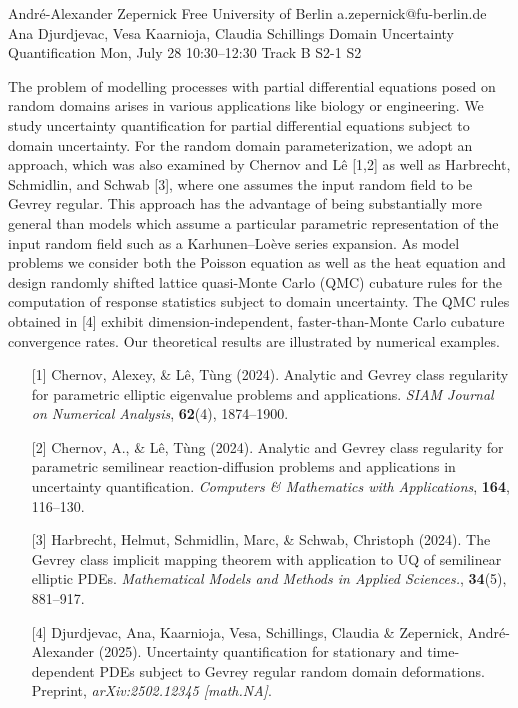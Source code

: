 \begin{talk}
  {André-Alexander Zepernick}%
  {Free University of Berlin}%
  {a.zepernick@fu-berlin.de}%
  {Ana Djurdjevac, Vesa Kaarnioja, Claudia Schillings}%
  {Domain Uncertainty Quantification}%
  {}%
  {Mon, July 28 10:30–12:30 Track B}%
  {S2-1}%
  {S2}%

The problem of modelling processes with partial differential equations posed on random domains arises in various applications like biology or engineering. We study uncertainty quantification for partial differential equations subject to domain uncertainty. For the random domain parameterization, we adopt an approach, which was also examined by Chernov and L\^{e} [1,2] as well as Harbrecht, Schmidlin, and Schwab [3], where one assumes the input random field to be Gevrey regular. This approach has the advantage of being substantially more general than models which assume a particular parametric representation of the input random field such as a Karhunen--Lo\`eve series expansion. As model problems we consider both the Poisson equation as well as the heat equation and design randomly shifted lattice quasi-Monte Carlo (QMC) cubature rules for the computation of response statistics subject to domain uncertainty. The QMC rules obtained in [4] exhibit dimension-independent, faster-than-Monte Carlo cubature convergence rates. Our theoretical results are illustrated by numerical examples.
\begin{enumerate}
    \item[{[1]}] Chernov, Alexey, \& L\^{e}, Tùng (2024). Analytic and Gevrey class regularity for parametric elliptic eigenvalue problems and applications. \emph{SIAM Journal on Numerical Analysis}, \textbf{62}(4), 1874--1900.
    \item[{[2]}] Chernov, A., \& L\^{e}, Tùng (2024). Analytic and Gevrey class regularity for parametric semilinear reaction-diffusion problems and applications in uncertainty quantification. \emph{Computers \& Mathematics with Applications}, \textbf{164}, 116--130.
    \item[{[3]}] Harbrecht, Helmut, Schmidlin, Marc, \& Schwab, Christoph (2024). The Gevrey class implicit mapping theorem with application to UQ of semilinear elliptic PDEs. \emph{Mathematical Models and Methods in Applied Sciences.}, \textbf{34}(5), 881--917.
    \item[{[4]}] Djurdjevac, Ana, Kaarnioja, Vesa, Schillings, Claudia \& Zepernick, André-Alexander (2025). Uncertainty quantification for stationary and time-dependent PDEs subject to Gevrey regular random domain deformations. Preprint, \emph{arXiv:2502.12345 [math.NA]}.
\end{enumerate}

\medskip

\end{talk}

